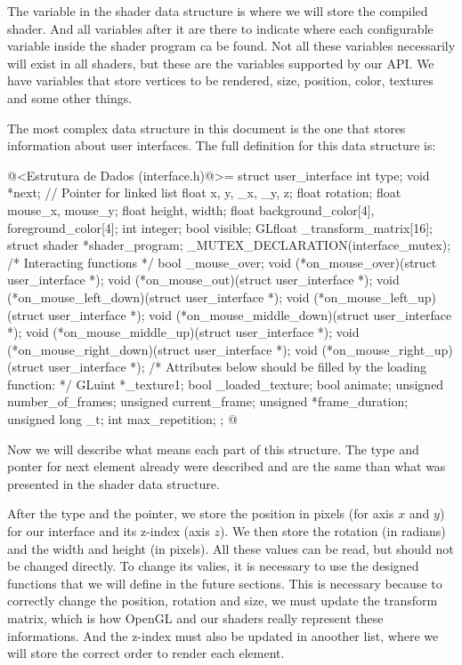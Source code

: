 The variable  in the shader data structure is
where we will store the compiled shader. And all variables after it
are there to indicate where each configurable variable inside the
shader program ca be found. Not all these variables necessarily will
exist in all shaders, but these are the variables supported by our
API. We have variables that store vertices to be rendered, size,
position, color, textures and some other things.


The most complex data structure in this document is the one that
stores information about user interfaces. The full definition for this
data structure is:

\iniciocodigo
@<Estrutura de Dados (interface.h)@>=
struct user_interface{
  int type;
  void *next; // Pointer for linked list
  float x, y, _x, _y, z;
  float rotation;
  float mouse_x, mouse_y;
  float height, width;
  float background_color[4], foreground_color[4];
  int integer;
  bool visible;
  GLfloat _transform_matrix[16];
  struct shader *shader_program;
  _MUTEX_DECLARATION(interface_mutex);
  /* Interacting functions */
  bool _mouse_over;
  void (*on_mouse_over)(struct user_interface *);
  void (*on_mouse_out)(struct user_interface *);
  void (*on_mouse_left_down)(struct user_interface *);
  void (*on_mouse_left_up)(struct user_interface *);
  void (*on_mouse_middle_down)(struct user_interface *);
  void (*on_mouse_middle_up)(struct user_interface *);
  void (*on_mouse_right_down)(struct user_interface *);
  void (*on_mouse_right_up)(struct user_interface *);
  /* Attributes below should be filled by the loading function: */
  GLuint *_texture1;
  bool _loaded_texture;
  bool animate;
  unsigned number_of_frames;
  unsigned current_frame;
  unsigned *frame_duration;
  unsigned long _t;
  int max_repetition;
};
@
\fimcodigo

Now we will describe what means each part of this structure. The type
and ponter for next element already were described and are the same
than what was presented in the shader data structure.

After the type and the pointer, we store the position in pixels (for
axis $x$ and $y$) for our interface and its z-index (axis $z$). We
then store the rotation (in radians) and the width and height (in
pixels). All these values can be read, but should not be changed
directly. To change its valies, it is necessary to use the designed
functions that we will define in the future sections. This is
necessary because to correctly change the position, rotation and size,
we must update the transform matrix, which is how OpenGL and our
shaders really represent these informations. And the z-index must also
be updated in anoother list, where we will store the correct order to
render each element.

